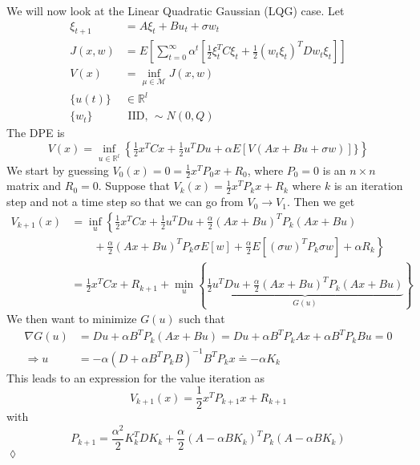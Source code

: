 \begin{example}
We will now look at the Linear Quadratic Gaussian (LQG) case.
Let
\begin{align*}
\xi_{t+1} &= A\xi_t+Bu_t+\sigma w_t \\
J(x,w) &= E\left[\sum_{t=0}^\infty \alpha^t\left[\frac{1}{2}\xi_t^T C\xi_t + \frac{1}{2}{(w_t \xi_t)}^T Dw_t \xi_t\right]\right] \\
V(x) &= \inf_{\mu\in\mathcal{M}}J(x,w) \\
\{u(t)\} &\in\mathbb{R}^l \\
\{w_t\} & \text{~IID,~} \sim N(0,Q)
\end{align*}
The DPE is
$$V(x) = \inf_{u\in\mathbb{R}^l}\left\lbrace\tfrac{1}{2}x^T Cx + \tfrac{1}{2}u^T Du + \alpha E[V(Ax+Bu+\sigma w)]\}\right\rbrace$$
We start by guessing $V_0(x)=0 = \frac{1}{2}x^T P_0 x+R_0$, where $P_0=0$ is an $n\times n$ matrix and $R_0=0$.
Suppose that $V_k(x) = \frac{1}{2}x^T P_k x+R_k$ where $k$ is an iteration step and not a time step so that we can go from $V_0\to V_1$.
Then we get
\begin{align*}
V_{k+1}(x) &= \inf_u\left\lbrace\frac{1}{2}x^T Cx+\frac{1}{2}u^T Du + \frac{\alpha}{2}{(Ax+Bu)}^T P_k(Ax+Bu) \right.\\
&\left.\qquad + \frac{\alpha}{2}{(Ax+Bu)}^T P_k\sigma E[w] + \frac{\alpha}{2}E[{(\sigma w)}^T P_k \sigma w] + \alpha R_k\right\rbrace \\
&= \frac{1}{2}x^T Cx + R_{k+1} + \min_u\left\lbrace\underbrace{\frac{1}{2}u^T Du + \frac{\alpha}{2}{(Ax+Bu)}^T P_k (Ax+Bu)}_{G(u)}\right\rbrace
\end{align*}
We then want to minimize $G(u)$ such that
\begin{align*}
\nabla G(u) &= Du+\alpha B^T P_k(Ax+Bu) = Du + \alpha B^T P_k Ax + \alpha B^T P_k Bu = 0 \\
\Rightarrow u &= -\alpha{(D+\alpha B^T P_k B)}^{-1}B^T P_k x \doteq -\alpha K_k
\end{align*}
This leads to an expression for the value iteration as
$$V_{k+1}(x) = \frac{1}{2}x^T P_{k+1}x + R_{k+1}$$
with
$$P_{k+1} = \frac{\alpha^2}{2}K_k^T DK_k + \frac{\alpha}{2}{(A-\alpha BK_k)}^T P_k(A-\alpha BK_k)$$
$\lozenge$
\end{example}%
